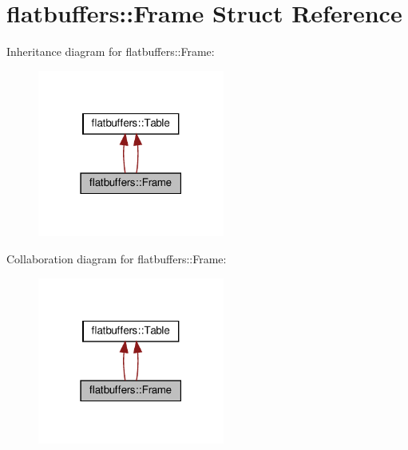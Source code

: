 \hypertarget{structflatbuffers_1_1Frame}{}\section{flatbuffers\+:\+:Frame Struct Reference}
\label{structflatbuffers_1_1Frame}


Inheritance diagram for flatbuffers\+:\+:Frame\+:
\nopagebreak
\begin{figure}[H]
\begin{center}
\leavevmode
\includegraphics[width=174pt]{structflatbuffers_1_1Frame__inherit__graph}
\end{center}
\end{figure}


Collaboration diagram for flatbuffers\+:\+:Frame\+:
\nopagebreak
\begin{figure}[H]
\begin{center}
\leavevmode
\includegraphics[width=174pt]{structflatbuffers_1_1Frame__coll__graph}
\end{center}
\end{figure}
